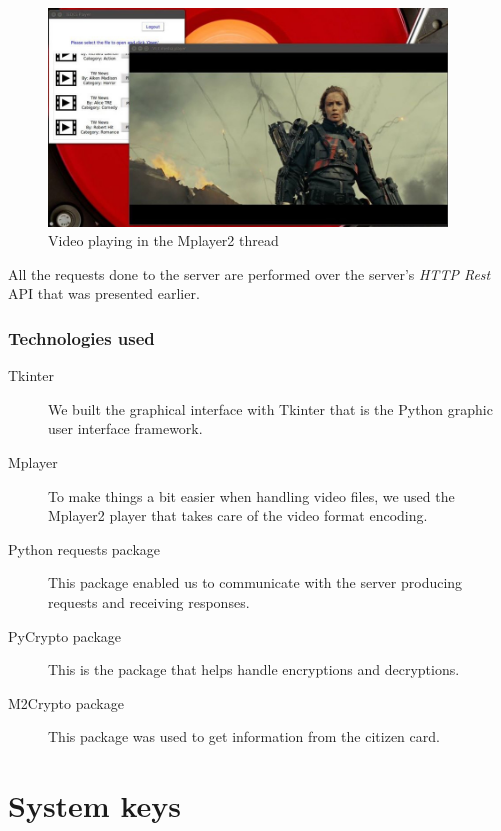 \documentclass[11pt,a4paper]{report}
\begin{document}
\begin{figure}[H]
\centerline{\includegraphics[width=300pt]{images/playerPlay.jpg}}
\caption{Video playing in the Mplayer2 thread}
\label{player}
\end{figure}


All the requests done to the server are performed over the server's \emph{HTTP Rest} API that was presented earlier.

\subsection{Technologies used}
\begin{description}
  \item[Tkinter] We built the graphical interface with Tkinter that is the Python graphic user interface framework.
  \item[Mplayer] To make things a bit easier when handling video files, we used the Mplayer2 player that takes care of the video format encoding.
  \item[Python requests package] This package enabled us to communicate with the server producing requests and receiving responses.
  \item[PyCrypto package] This is the package that helps handle encryptions and decryptions.
  \item[M2Crypto package] This package was used to get information from the citizen card.
\end{description}

\chapter{System keys}
\end{document}
